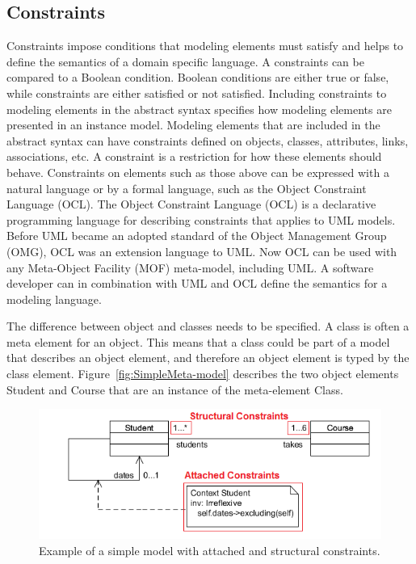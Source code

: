 \subsection{Constraints}

Constraints impose conditions that modeling elements must satisfy and helps
to define the semantics of a domain specific language. A constraints can be
compared to a Boolean condition. Boolean conditions are either true or false,
while constraints are either satisfied or not satisfied. Including constraints
to modeling elements in the abstract syntax specifies how modeling elements
are presented in an instance model. Modeling elements that are included in the
abstract syntax can have constraints defined on objects, classes, attributes, links,
associations, etc. A constraint is a restriction for how these elements should
behave. Constraints on elements such as those above can be expressed with a
natural language or by a formal language, such as the Object Constraint
Language\cite{OCL} (OCL). The Object Constraint Language (OCL) is a declarative
programming language for describing constraints that applies to UML models.
Before UML became an adopted standard of the Object Management Group (OMG), OCL
was an extension language to UML. Now OCL can be used with any Meta-Object
Facility (MOF) meta-model, including UML. A software developer can in
combination with UML and OCL define the semantics for a modeling
language\cite{Warmer:2003:OCL:861416}.

The difference between object and classes needs to be specified. A class
is often a meta element for an object. This means that a class could be part of
a model that describes an object element, and therefore an object element is
typed by the class element\cite{OO_UML}. Figure~\ref{fig:SimpleMeta-model}
describes the two object elements Student and Course that are an instance of the
meta-element Class.

\begin{figure}[H]
	\centering
	\includegraphics[scale=0.7]{./Figures/Constraints.png}
	\caption[Simple model with constraints]
	{Example of a simple model with attached and structural constraints.}
	\label{fig:Constraints}
\end{figure}

